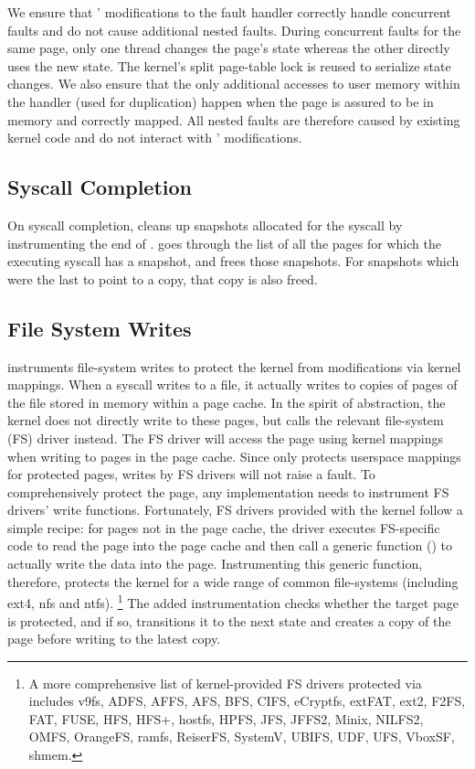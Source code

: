 \documentclass[letterpaper,twocolumn,10pt]{article}
\begin{document}
We ensure that \midas' modifications to the fault handler
correctly handle concurrent faults and do not cause additional
nested faults.
During concurrent faults for the same page, only one thread
changes the page's state whereas the other directly uses the new
state.
The kernel's split page-table lock is reused to serialize state
changes.
We also ensure that the only additional accesses to user memory
within the handler (used for duplication) happen when the page
is assured to be in memory and correctly mapped.
All nested faults are therefore caused by existing kernel code
and do not interact with \midas' modifications.

\subsection{Syscall Completion}

On syscall completion, \midas cleans up snapshots allocated for
the syscall by instrumenting the end of .
\midas goes through the list of all the pages for which the
executing syscall has a snapshot, and frees those snapshots.
For snapshots which were the last to point to a copy, that
copy is also freed.


\subsection{File System Writes}

\midas instruments file-system writes to protect the kernel
from modifications via kernel mappings.
When a  syscall writes to a file, it actually
writes to copies of pages of the file stored in memory within
a page cache.
In the spirit of abstraction, the kernel does not directly write to
these pages, but calls the relevant file-system (FS) driver instead.
The FS driver will access the page using kernel mappings when writing to pages in the page cache.
Since \midas only protects userspace mappings for protected pages,
writes by FS drivers will not raise a fault.
To comprehensively protect the page, any implementation needs to
instrument FS drivers' write functions.
Fortunately, FS drivers provided with the kernel follow a simple
recipe: for pages not in the page cache, the driver executes
FS-specific code to read the page into the page cache and then
call a generic function () to actually
write the data into the page.
Instrumenting this generic function, therefore, protects the kernel
for a wide range of common file-systems (including ext4, nfs and
ntfs). \footnote{A more comprehensive list of kernel-provided FS drivers
protected via  includes v9fs, ADFS, AFFS,
AFS, BFS, CIFS, eCryptfs, extFAT, ext2, F2FS,  FAT, FUSE, HFS, HFS+,
hostfs, HPFS, JFS, JFFS2, Minix, NILFS2, OMFS, OrangeFS, ramfs, ReiserFS,
SystemV, UBIFS, UDF, UFS, VboxSF, shmem.}
The added instrumentation checks whether the target page is
protected, and if so, transitions it to the next state and
creates a copy of the page before writing to the latest copy.
\end{document}
